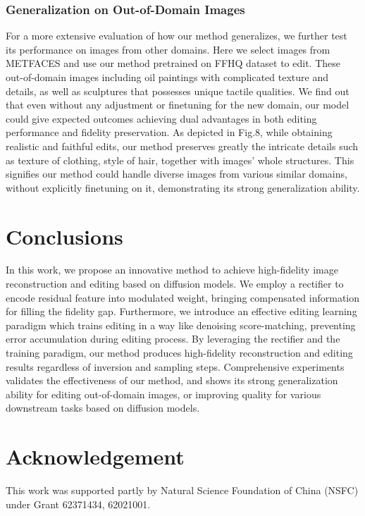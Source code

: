 \documentclass[letterpaper]{article} %
\begin{document}
\subsubsection{Generalization on Out-of-Domain Images}

For a more extensive evaluation of how our method generalizes, we further test its performance on images from other domains. Here we select images from METFACES and use our method pretrained on FFHQ dataset to edit. These out-of-domain images including oil paintings with complicated texture and details, as well as sculptures that possesses unique tactile qualities. We find out that even without any adjustment or finetuning for the new domain, our model could give expected outcomes achieving dual advantages in both editing performance and fidelity preservation. As depicted in Fig.8, while obtaining realistic and faithful edits, our method preserves greatly the intricate details such as texture of clothing, style of hair, together with images' whole structures. This signifies our method could handle diverse images from various similar domains, without explicitly finetuning on it, demonstrating its strong generalization ability.

\section{Conclusions}
In this work, we propose an innovative method to achieve high-fidelity image reconstruction and editing based on diffusion models. We employ a rectifier to encode residual feature into modulated weight, bringing compensated information for filling the fidelity gap. Furthermore, we introduce an effective editing learning paradigm which trains editing in a way like denoising score-matching, preventing error accumulation during editing process. By leveraging the rectifier and the training paradigm, our method produces high-fidelity reconstruction and editing results regardless of inversion and sampling steps. Comprehensive experiments validates the effectiveness of our method, and shows its strong generalization ability for editing out-of-domain images, or improving quality for various downstream tasks based on diffusion models.

\section{Acknowledgement}
This work was supported partly by Natural Science Foundation of China (NSFC) under Grant 62371434, 62021001.
\end{document}
